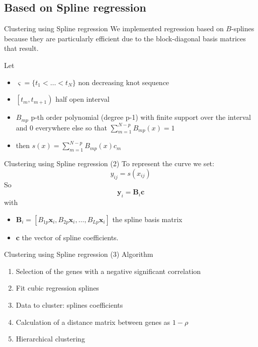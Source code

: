 \documentclass[handout]{beamer}
\begin{document}
\subsection{Based on Spline regression}


\begin{frame}{Clustering using Spline regression }
We implemented regression based on  $B$-splines because they are particularly efficient due to the block-diagonal basis matrices that result.

Let 
\begin {itemize}
\item $\varsigma=\lbrace t_1 < \ldots < t_N \rbrace$ non decreasing  knot sequence 
\item $\left[ t_m,t_{m+1} \right)$ half open interval
\item $B_{mp}$ p-th order polynomial (degree p-1) with finite support over the interval and 0 everywhere else so that  $\sum_{m=1}^{N-p}B_{mp}(x)=1$
\item then  $s(x)=\sum_{m=1}^{N-p}B_{mp}(x)c_m$ 
\end{itemize}
\end{frame}

\begin{frame}{Clustering using Spline regression (2)}
To represent the curve we set:
\[
y_{ij}=s(x_{ij})
\]
So
\[ 
\mathbf{y}_i=\mathbf{B}_i\mathbf{c}
\]
with
\begin {itemize}
\item $\mathbf{B}_i=\left[ B_{1p}\mathbf{x}_i,B_{2p}\mathbf{x}_i,\dots,B_{Lp}\mathbf{x}_i \right]$ the spline basis matrix
\item $\mathbf{c}$ the vector of spline coefficients.
\end{itemize}
\end{frame}

\begin{frame}{Clustering using Spline regression (3)}
Algorithm
\begin {enumerate}
\item Selection of the genes with a negative significant correlation
\item Fit cubic regression splines
\item Data to cluster: splines coefficients
\item Calculation of a distance matrix between genes as $1-\rho$
\item Hierarchical clustering 
\end{enumerate}
\end{frame}
\end{document}
